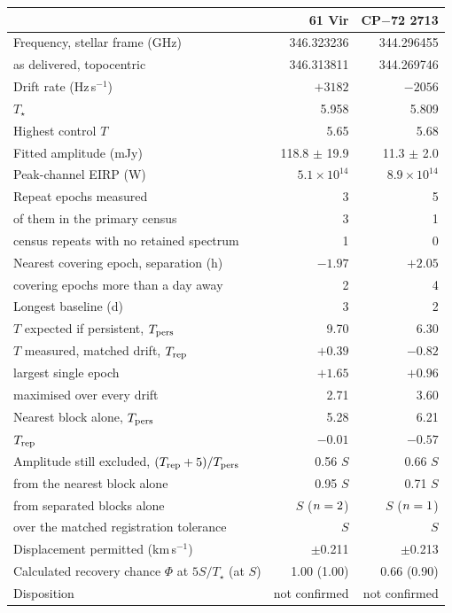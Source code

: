 \begin{tabular}{@{}>{\raggedright\arraybackslash}p{}@{~~}r@{~~}r@{}}
\hline
 & 61 Vir & CP$-$72 2713 \\
\hline
Frequency, stellar frame (GHz) & 346.323236 & 344.296455 \\
\quad as delivered, topocentric & 346.313811 & 344.269746 \\
Drift rate (Hz\,s$^{-1}$) & $+3182$ & $-2056$ \\
$T_\star$ & 5.958 & 5.809 \\
Highest control $T$ & 5.65 & 5.68 \\
Fitted amplitude (mJy) & 118.8 $\pm$ 19.9 & 11.3 $\pm$ 2.0 \\
Peak-channel EIRP (W) & $5.1 \times 10^{14}$ & $8.9 \times 10^{14}$ \\
Repeat epochs measured & 3 & 5 \\
\quad of them in the primary census & 3 & 1 \\
\quad census repeats with no retained spectrum & 1 & 0 \\
Nearest covering epoch, separation (h) & $-1.97$ & $+2.05$ \\
\quad covering epochs more than a day away & 2 & 4 \\
Longest baseline (d) & 3 & 2 \\
$T$ expected if persistent, $T_{\rm pers}$ & 9.70 & 6.30 \\
$T$ measured, matched drift, $T_{\rm rep}$ & $+0.39$ & $-0.82$ \\
\quad largest single epoch & $+1.65$ & $+0.96$ \\
\quad maximised over every drift & 2.71 & 3.60 \\
Nearest block alone, $T_{\rm pers}$ & 5.28 & 6.21 \\
\quad $T_{\rm rep}$ & $-0.01$ & $-0.57$ \\
Amplitude still excluded, $(T_{\rm rep}+5)/T_{\rm pers}$ & 0.56 $S$ & 0.66 $S$ \\
\quad from the nearest block alone & 0.95 $S$ & 0.71 $S$ \\
\quad from separated blocks alone & \SpSxFracSep{} $S$ ($n=2$) & \SpCpFracSep{} $S$ ($n=1$) \\
\quad over the matched registration tolerance & \SpSxFracTol{} $S$ & \SpCpFracTol{} $S$ \\
Displacement permitted (km\,s$^{-1}$) & $\pm$0.211 & $\pm$0.213 \\
Calculated recovery chance $\Phi$ at $5S/T_\star$ (at $S$) & 1.00 (1.00) & 0.66 (0.90) \\
Disposition & not confirmed & not confirmed \\
\hline
\end{tabular}
